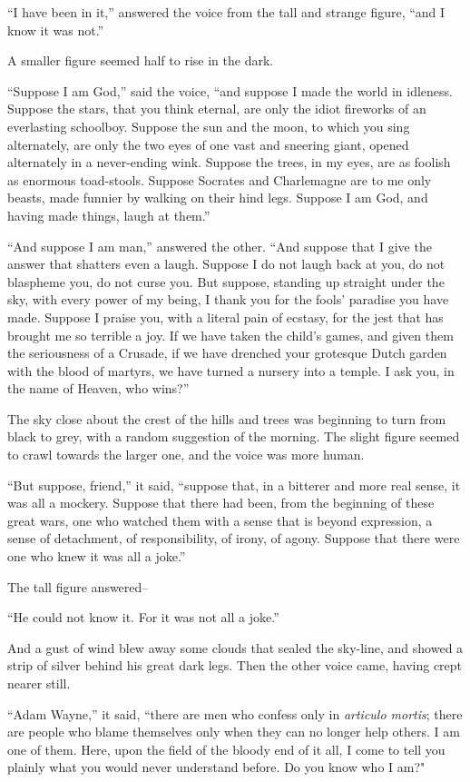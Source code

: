 \documentclass{book}
\begin{document}
“I have been in it,” answered the voice from the tall and strange figure, “and I know it was not.”

A smaller figure seemed half to rise in the dark.

“Suppose I am God,” said the voice, “and suppose I made the world in idleness. Suppose the stars, that you think eternal, are only the idiot fireworks of an everlasting schoolboy. Suppose the sun and the moon, to which you sing alternately, are only the two eyes of one vast and sneering giant, opened alternately in a never-ending wink. Suppose the trees, in my eyes, are as foolish as enormous toad-stools. Suppose Socrates and Charlemagne are to me only beasts, made funnier by walking on their hind legs. Suppose I am God, and having made things, laugh at them.”

“And suppose I am man,” answered the other. “And suppose that I give the answer that shatters even a laugh. Suppose I do not laugh back at you, do not blaspheme you, do not curse you. But suppose, standing up straight under the sky, with every power of my being, I thank you for the fools’ paradise you have made. Suppose I praise you, with a literal pain of ecstasy, for the jest that has brought me so terrible a joy. If we have taken the child’s games, and given them the seriousness of a Crusade, if we have drenched your grotesque Dutch garden with the blood of martyrs, we have turned a nursery into a temple. I ask you, in the name of Heaven, who wins?”

The sky close about the crest of the hills and trees was beginning to turn from black to grey, with a random suggestion of the morning. The slight figure seemed to crawl towards the larger one, and the voice was more human.

“But suppose, friend,” it said, “suppose that, in a bitterer and more real sense, it was all a mockery. Suppose that there had been, from the beginning of these great wars, one who watched them with a sense that is beyond expression, a sense of detachment, of responsibility, of irony, of agony. Suppose that there were one who knew it was all a joke.”

The tall figure answered–

“He could not know it. For it was not all a joke.”

And a gust of wind blew away some clouds that sealed the sky-line, and showed a strip of silver behind his great dark legs. Then the other voice came, having crept nearer still.

“Adam Wayne,” it said, “there are men who confess only in \emph{articulo mortis}; there are people who blame themselves only when they can no longer help others. I am one of them. Here, upon the field of the bloody end of it all, I come to tell you plainly what you would never understand before. Do you know who I am?"
\end{document}
